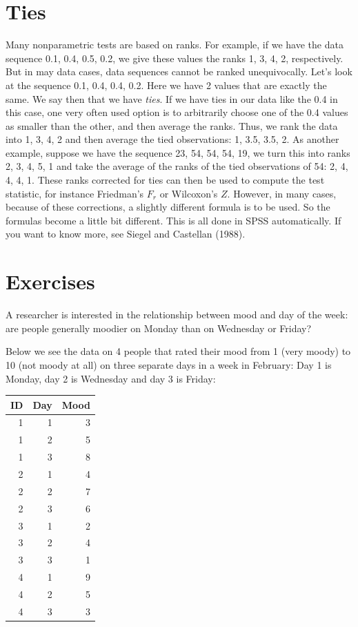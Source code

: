 \documentclass[]{book}\usepackage[]{graphicx}\usepackage[]{color}
\newenvironment{knitrout}{}{} %
\begin{document}
\section{Ties}

Many nonparametric tests are based on ranks. For example, if we have the data sequence {0.1, 0.4, 0.5, 0.2}, we give these values the ranks {1, 3, 4, 2}, respectively. But in may data cases, data sequences cannot be ranked unequivocally. Let's look at the sequence {0.1, 0.4, 0.4, 0.2}. Here we have 2 values that are exactly the same. We say then that we have \textit{ties}. If we have ties in our data like the 0.4 in this case, one very often used option is to arbitrarily choose one of the 0.4 values as smaller than the other, and then average the ranks. Thus, we rank the data into {1, 3, 4, 2} and then average the tied observations: {1, 3.5, 3.5, 2}. As another example, suppose we have the sequence {23, 54, 54, 54, 19}, we turn this into ranks {2, 3, 4, 5, 1} and take the average of the ranks of the tied observations of 54: {2, 4, 4, 4, 1}. These ranks corrected for ties can then be used to compute the test statistic, for instance Friedman's $F_r$ or Wilcoxon's $Z$. However, in many cases, because of these corrections, a slightly different formula is to be used. So the formulas become a little bit different. This is all done in SPSS automatically. If you want to know more, see Siegel and Castellan (1988).




\section{Exercises}


A researcher is interested in the relationship between mood and day of the week: are people generally moodier on Monday than on Wednesday or Friday?

Below we see the data on 4 people that rated their mood from 1 (very moody) to 10 (not moody at all) on three separate days in a week in February: Day 1 is Monday, day 2 is Wednesday and day 3 is Friday:

\begin{knitrout}
\color{fgcolor}
\begin{tabular}{r|r|r}
\hline
ID & Day & Mood\\
\hline
1 & 1 & 3\\
\hline
1 & 2 & 5\\
\hline
1 & 3 & 8\\
\hline
2 & 1 & 4\\
\hline
2 & 2 & 7\\
\hline
2 & 3 & 6\\
\hline
3 & 1 & 2\\
\hline
3 & 2 & 4\\
\hline
3 & 3 & 1\\
\hline
4 & 1 & 9\\
\hline
4 & 2 & 5\\
\hline
4 & 3 & 3\\
\hline
\end{tabular}


\end{knitrout}
\end{document}

